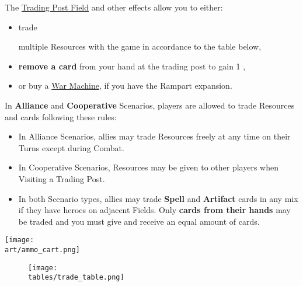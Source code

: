 \begin{multicols}{2}

The \hyperlink{Trading Post}{Trading Post Field} and other effects allow you to either:
\begin{itemize}
  \item \hypertarget{Trading}{trade} multiple Resources with the game in accordance to the table below,
  \item \textbf{remove a card} from your hand at the trading post to gain 1 ,
    \par
  \item or buy a \hyperlink{War Machines}{War Machine}, if you have the Rampart expansion.
\end{itemize}
In \textbf{Alliance} and \textbf{Cooperative} Scenarios, players are allowed to trade Resources and cards following these rules:
\begin{itemize}
  \item In Alliance Scenarios, allies may trade Resources freely at any time on their Turns except during Combat.
  \item In Cooperative Scenarios, Resources may be given to other players when Visiting a Trading Post.
  \columnbreak
  \item In both Scenario types, allies may trade \textbf{Spell} and \textbf{Artifact} cards in any mix if they have heroes on adjacent Fields.
    Only \textbf{cards from their hands} may be traded and you must give and receive an equal amount of cards.
\end{itemize}

\vspace*{\fill}
\texttt{[image: \\art/ammo\_cart.png]}

\end{multicols}

\vfill
\begin{figure*}[!hb]
  \centering
  \texttt{[image: \\tables/trade\_table.png]}
\end{figure*}
\vfill
